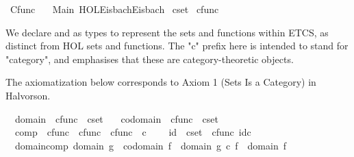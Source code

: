%
\begin{isabellebody}%
%
%
\isadelimtheory
%
\endisadelimtheory
%
\isatagtheory
{}\isamarkupfalse%
\ Cfunc\isanewline
\ \ \ Main\ {\isachardoublequoteopen}HOL{\isacharminus}{\kern0pt}Eisbach{\isachardot}{\kern0pt}Eisbach{\isachardoublequoteclose}\isanewline
{}%
\endisatagtheory
{\isafoldtheory}%
%
\isadelimtheory
%
\endisadelimtheory
%
\isadelimdocument
%
\endisadelimdocument
%
\isatagdocument
%
\isamarkuptrue%
%
\endisatagdocument
{\isafolddocument}%
%
\isadelimdocument
%
\endisadelimdocument
{}\isamarkupfalse%
\ cset\isanewline
{}\isamarkupfalse%
\ cfunc%
\begin{isamarkuptext}%
We declare  and  as types to represent the sets and functions within
  ETCS, as distinct from HOL sets and functions.
  The "c" prefix here is intended to stand for "category", and emphasises that these are
  category-theoretic objects.%
\end{isamarkuptext}\isamarkuptrue%
%
\begin{isamarkuptext}%
The axiomatization below corresponds to Axiom 1 (Sets Is a Category) in Halvorson.%
\end{isamarkuptext}\isamarkuptrue%
\isamarkupfalse%
\isanewline
\ \ domain\ {\isacharcolon}{\kern0pt}{\isacharcolon}{\kern0pt}\ {\isachardoublequoteopen}cfunc\ {\isasymRightarrow}\ cset{\isachardoublequoteclose}\ \isanewline
\ \ codomain\ {\isacharcolon}{\kern0pt}{\isacharcolon}{\kern0pt}\ {\isachardoublequoteopen}cfunc\ {\isasymRightarrow}\ cset{\isachardoublequoteclose}\ \isanewline
\ \ comp\ {\isacharcolon}{\kern0pt}{\isacharcolon}{\kern0pt}\ {\isachardoublequoteopen}cfunc\ {\isasymRightarrow}\ cfunc\ {\isasymRightarrow}\ cfunc{\isachardoublequoteclose}\ {\isacharparenleft}{\kern0pt}\ {\isachardoublequoteopen}{\isasymcirc}\isactrlsub c{\isachardoublequoteclose}\ {}{}{\isacharparenright}{\kern0pt}\ \isanewline
\ \ id\ {\isacharcolon}{\kern0pt}{\isacharcolon}{\kern0pt}\ {\isachardoublequoteopen}cset\ {\isasymRightarrow}\ cfunc{\isachardoublequoteclose}\ {\isacharparenleft}{\kern0pt}{\isachardoublequoteopen}id\isactrlsub c{\isachardoublequoteclose}{\isacharparenright}{\kern0pt}\ \isanewline
{}\isanewline
\ \ domain{\isacharunderscore}{\kern0pt}comp{\isacharcolon}{\kern0pt}\ {\isachardoublequoteopen}domain\ g\ {\isacharequal}{\kern0pt}\ codomain\ f\ {\isasymLongrightarrow}\ domain\ {\isacharparenleft}{\kern0pt}g\ {\isasymcirc}\isactrlsub c\ f{\isacharparenright}{\kern0pt}\ {\isacharequal}{\kern0pt}\ domain\ f{\isachardoublequoteclose}\ \isanewline

\end{isabellebody}
